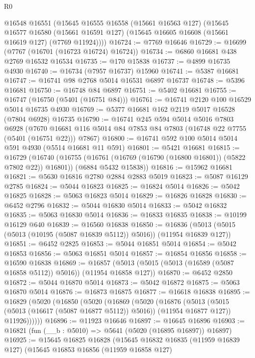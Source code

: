\begin{lexlean}{R0}
\begin{coremodule}
    @16548
    @16551
    (@15645
      @16555
      @16558
      (@15661 @16563 @127)
      (@15645
        @16577
        @16580
        (@15661 @16591 @127)
        (@15645 @16605 @16608 (@15661 @16619 @127) (@7769 @11924))))
@16724 := @7769 @16646
@16729 := @16699 (@7767 (@16701 (@16723 @16724) @16724))
@16734 := @6860 @16681 @438 @2769 @16532 @16534
@16735 := @170 @15838
@16737 := @4899 @16735 @4930
@16740 := @16734 (@7957 @16737) @15960
@16741 := @5387 @16681
@16747 := @16741 @98 @2768 @5014 @16531 @6897 @16737
@16748 := @5396 @16681
@16750 := @16748 @84 @6897
@16751 := @5402 @16681
@16755 := @16747 (@16750 (@5401 (@16751 @84)))
@16761 := @16741 @2120 @100 @16529 @5014 @16735 @4930
@16769 := @5377 @16681 @162 @2119 @5017 @16528 (@7804 @6928) @16735
@16790 := @16741
    @245
    @594
    @5014
    @5016
    @7803
    @6928
    (@7670 @16681 @116 @5014 @84 @7853 @84 @7803 (@16748 @22 @7755 (@5401 (@16751 @22))) @7867)
@16800 := @16741 @592 @100 @5014 @5014 @591 @4930 (@5514 @16681 @11 @591)
@16801 := @5421 @16681
@16815 := @16729
    (@16740
      (@16755 (@16761 (@16769 (@16790 (@16800 @16801)) (@5822 @7802 @22)) @16801))
      (@6884 @5432 @15838))
@16816 := @15962 @16681
@16821 := @5630 @16816 @2780 @2884 @2883 @5019
@16823 := @5087 @16129 @2785
@16824 := @5044 @16823
@16825 := @16824 @5014
@16826 := @5042 @16825
@16828 := @5063 @16823 @5014
@16829 := @16826 @16828
@16830 := @6452 @2796
@16832 := @5044 @16830 @5014
@16833 := @5042 @16832
@16835 := @5063 @16830 @5014
@16836 := @16833 @16835
@16838 := @10199 @16129 @640
@16839 := @16560 @16838
@16850 := @16836 (@5013 (@5015 (@5013 (@10195 (@5087 @16839 @5112)) @5016)) (@11954 @16839 @127))
@16851 := @6452 @2825
@16853 := @5044 @16851 @5014
@16854 := @5042 @16853
@16856 := @5063 @16851 @5014
@16857 := @16854 @16856
@16858 := @16590 @16838
@16869 := @16857 (@5013 (@5015 (@5013 (@16589 (@5087 @16858 @5112)) @5016)) (@11954 @16858 @127))
@16870 := @6452 @2850
@16872 := @5044 @16870 @5014
@16873 := @5042 @16872
@16875 := @5063 @16870 @5014
@16876 := @16873 @16875
@16877 := @16618 @16838
@16895 := @16829
    (@5020
      (@16850
        (@5020
          (@16869
            (@5020
              (@16876
                (@5013 (@5015 (@5013 (@16617 (@5087 @16877 @5112)) @5016)) (@11954 @16877 @127))
                @11926))))))
@16896 := @11923 @16646
@16897 := @16645 @16896
@16903 := @16821 (fun (__b : @5010) => @5641 (@5020 (@16895 @16897)) @16897)
@16925 := @15645
    @16825
    @16828
    (@15645
      @16832
      @16835
      (@11959 @16839 @127)
      (@15645
        @16853
        @16856
        (@11959 @16858 @127)

\end{coremodule}
\end{lexlean}
